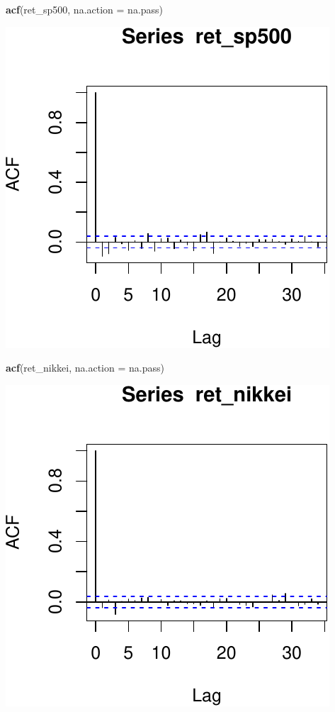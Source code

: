 \documentclass[11pt,]{article}
\newenvironment{Shaded}{\begin{snugshade}}{\end{snugshade}}
\newcommand{\KeywordTok}[1]{\textcolor[rgb]{0.13,0.29,0.53}{\textbf{#1}}}
\newcommand{\DataTypeTok}[1]{\textcolor[rgb]{0.13,0.29,0.53}{#1}}
\newcommand{\NormalTok}[1]{#1}
\begin{document}
\begin{Shaded}
\begin{Highlighting}[]
\KeywordTok{acf}\NormalTok{(ret_sp500, }\DataTypeTok{na.action =}\NormalTok{ na.pass)}
\end{Highlighting}
\end{Shaded}

\begin{center}\includegraphics{FMC_T4_PhD_ARMA_GARCH_files/figure-latex/sample_ACF-2} \end{center}

\begin{Shaded}
\begin{Highlighting}[]
\KeywordTok{acf}\NormalTok{(ret_nikkei, }\DataTypeTok{na.action =}\NormalTok{ na.pass)}
\end{Highlighting}
\end{Shaded}

\begin{center}\includegraphics{FMC_T4_PhD_ARMA_GARCH_files/figure-latex/sample_ACF-3} \end{center}
\end{document}

